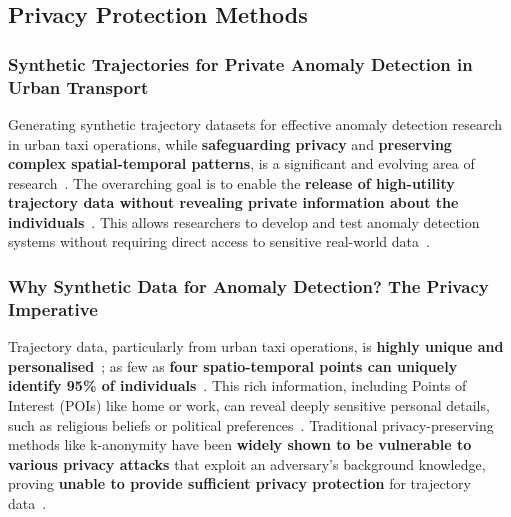\documentclass[runningheads]{llncs}
\begin{document}
\subsection{Privacy Protection Methods}
\label{sec:privacy-review}

\subsubsection{Synthetic Trajectories for Private Anomaly Detection in Urban Transport}

Generating synthetic trajectory datasets for effective anomaly detection research in urban taxi operations, while \textbf{safeguarding privacy} and \textbf{preserving complex spatial-temporal patterns}, is a significant and evolving area of research~\cite{Buchholz2024SoK,Buchholz2022RAoPT,Primault2019LongRoad,Naghizade2020PrivacyContextAware}. The overarching goal is to enable the \textbf{release of high-utility trajectory data without revealing private information about the individuals}~\cite{Buchholz2024SoK,Rao2021LSTMTrajGAN,Liu2018TrajGANs,Jin2023SurveyExpStudy,Ma2021TrajectoryPrivacy,Naghizade2020PrivacyContextAware}. This allows researchers to develop and test anomaly detection systems without requiring direct access to sensitive real-world data~\cite{Buchholz2024SoK,Rao2021LSTMTrajGAN,Liu2018TrajGANs}.

\subsubsection{Why Synthetic Data for Anomaly Detection? The Privacy Imperative}

Trajectory data, particularly from urban taxi operations, is \textbf{highly unique and personalised}~\cite{Primault2019LongRoad,Buchholz2022RAoPT,Ma2021TrajectoryPrivacy}; as few as \textbf{four spatio-temporal points can uniquely identify 95\% of individuals}~\cite{Primault2019LongRoad,Buchholz2022RAoPT,Ma2021TrajectoryPrivacy}. This rich information, including Points of Interest (POIs) like home or work, can reveal deeply sensitive personal details, such as religious beliefs or political preferences~\cite{Primault2019LongRoad,Buchholz2022RAoPT}. Traditional privacy-preserving methods like k-anonymity have been \textbf{widely shown to be vulnerable to various privacy attacks} that exploit an adversary's background knowledge, proving \textbf{unable to provide sufficient privacy protection} for trajectory data~\cite{Chen2011DPTP,Buchholz2022RAoPT,Jin2023SurveyExpStudy}.
\end{document}
